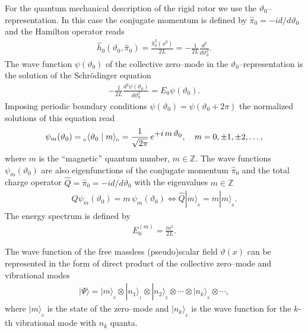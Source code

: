 \documentclass[a4paper,12pt] {article}
\begin{document}
For the quantum mechanical description of the rigid rotor we use the
$\vartheta_0$--representation. In this case the conjugate momentum is
defined by $\hat{\pi}_0 = -i d/d\vartheta_0$ and the Hamilton operator
reads
%
\begin{eqnarray}\label{label2.14}
\hat{h}_0(\vartheta_0,\hat{\pi}_0) = \frac{\hat{\pi}^2_0(x^0)}{2 L} =
-\frac{1}{2 L}\frac{d^2}{d \vartheta^2_0}.
\end{eqnarray}
%
The wave function $\psi(\vartheta_0)$ of the collective zero--mode in
the $\vartheta_0$--representation is the solution of the Schr\"odinger
equation
%
\begin{eqnarray}\label{label2.15}
-\frac{1}{2 L}\frac{d^2\psi(\vartheta_0)}{d \vartheta^2_0} =
E_0\psi(\vartheta_0).
\end{eqnarray}
%
Imposing periodic boundary conditions $\psi(\vartheta_0) =
\psi(\vartheta_0 + 2\pi)$ the normalized solutions of this equation
read
%
\begin{eqnarray}\label{label2.16}
\psi_m(\vartheta_0) = \vspace{1mm}_{_0}\vspace{-1mm}\langle \vartheta_0 \mid m \rangle_{_0} = \frac{1}{\sqrt{2\pi}}\,e^{\textstyle
+i\,m\,\vartheta_0},\quad m=0,\pm1,\pm 2,\ldots,
\end{eqnarray}
%
where $m$ is the ``magnetic'' quantum number, $m \in \mathbb{Z}$. The
wave functions $\psi_m(\vartheta_0)$ are also eigenfunctions of the
conjugate momentum $\hat{\pi}_0$ and the total charge operator
$\hat{Q} = \hat{\pi}_0 = -i d/d\vartheta_0$ with the eigenvalues $m
\in \mathbb{Z}$
%
\begin{eqnarray}\label{label2.17}
Q\psi_m(\vartheta_0) = m\,\psi_m(\vartheta_0) \Longleftrightarrow
\hat{Q}|m\rangle_{_0} = m|m\rangle_{_0}.
\end{eqnarray}
%
The energy spectrum is defined by
%
\begin{eqnarray}\label{label2.18}
E^{(m)}_0 = \frac{m^2}{2L}.
\end{eqnarray}

The wave function of the free massless (pseudo)scalar field
$\vartheta(x)$ can be represented in the form of direct product of the
collective zero--mode and vibrational modes
%
\begin{eqnarray}\label{label2.19}
|\Psi\rangle = |m\rangle_{_0} \otimes |n_1\rangle_{_1} \otimes |n_2\rangle_{_2} \otimes  \cdots \otimes |n_k \rangle_{_k} \otimes \cdots,
\end{eqnarray}
%
where $|m\rangle_{_0}$ is the state of the zero--mode and $|n_k
\rangle_{_k}$ is the wave function for the $k$-th
vibrational mode with $n_k$ quanta.
\end{document}
